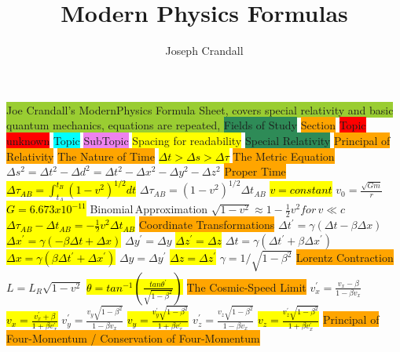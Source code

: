 \documentclass[6pt, oneside]{article}   	%
\title{Modern Physics Formulas}
\author{Joseph Crandall}
\begin{document}

\colorbox{YellowGreen}{Joe Crandall's ModernPhysics Formula Sheet, covers special relativity and basic quantum mechanics, equations are repeated, }
\colorbox{SeaGreen}{Fields of Study}
\colorbox{Orange}{Section}
\colorbox{Red}{Topic unknown}
\colorbox{Cyan}{Topic}
\colorbox{Violet}{SubTopic}
\colorbox{Yellow}{Spacing for readability}
\colorbox{SeaGreen}{Special Relativity}
\colorbox{Orange}{Principal of Relativity}
\colorbox{Orange}{ The Nature of Time}
\hl{$\Delta t >  \Delta s > \Delta \tau$}
\colorbox{Orange}{The Metric Equation}
$\Delta s^{2} = \Delta t^2 - \Delta d^2 = \Delta t^{2} - \Delta x^{2} - \Delta y^{2} - \Delta z^{2}$
\colorbox{Orange}{Proper Time}
\hl{$\Delta \tau_{AB} = \int_{t_A}^{t_B} (1-v^2)^{1/2} dt$}
$ \Delta \tau_{AB} = (1-v^2)^{1/2} \Delta t_{AB} $
\hl{$v = constant $}
$ v_0 = \frac{\sqrt{Gm}}{r} $
\hl{$ G = 6.673 x 10^{-11}$}
Binomial\,Approximation $ \sqrt{1-v^2} \approx 1-\frac{1}{2}v^2 for\, v \ll c$
\hl{$ \Delta \tau_{AB} - \Delta t_{AB} = -\frac{1}{2}v^2 \Delta t_{AB}$}
\colorbox{Orange}{Coordinate Transformations}
$\Delta t^{\prime} = \gamma(\Delta t-\beta \Delta x) $
\hl{$\Delta x^{\prime} = \gamma(-\beta \Delta t + \Delta x) $}
$\Delta y^{\prime} = \Delta y $
\hl{$\Delta z^{\prime} = \Delta z $}
$\Delta t = \gamma(\Delta t^{\prime} + \beta \Delta x^{\prime}) $ 
\hl{$\Delta x = \gamma(\beta \Delta t^{\prime} + \Delta x^{\prime}) $ }
$\Delta y = \Delta y^{\prime} $
\hl{$\Delta z = \Delta z^{\prime} $}
$\gamma = 1/\sqrt{1-\beta^{2}} $
\colorbox{Orange}{Lorentz Contraction}
$L = L_R \sqrt{1-v^2} $
\hl{$\theta = tan^{-1} (\frac{tan\theta^{\prime}}{\sqrt{1-\beta^2}})$}
\colorbox{Orange}{The Cosmic-Speed Limit}
$v_x^{\prime} = \frac{v_x - \beta}{1 - \beta v_x}  $
\hl{$v_x = \frac{v_x^{\prime} + \beta}{1 + \beta v_x^{\prime}}  $}
$v_y^{\prime} = \frac{v_y \sqrt{1 - \beta^2}}		{1 - \beta v_x}  $
\hl{$v_y= \frac{v_y^{\prime} \sqrt{ 1 - \beta^2}}		{1 + \beta v_x^{\prime}} $}
$v_z^{\prime} = \frac{v_z \sqrt{1 - \beta^2}}		{1 - \beta v_x}  $
\hl{$v_z = \frac	{v_z^{\prime} \sqrt{ 1 - \beta^2}}	{1 + \beta v_x^{\prime}} $}
\colorbox{Orange}{Principal of Four-Momentum / Conservation of Four-Momentum}
\end{document}
